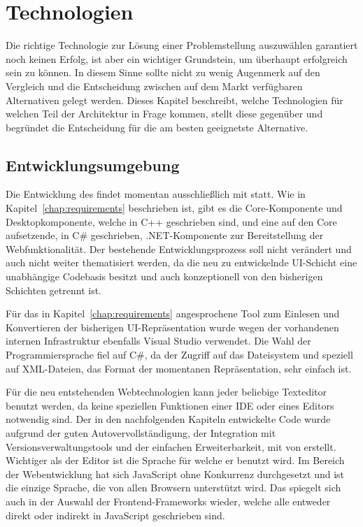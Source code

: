 \chapter{Technologien}\label{chap:technologies}
Die richtige Technologie zur Lösung einer Problemstellung auszuwählen garantiert noch keinen Erfolg, ist aber ein wichtiger Grundstein, um überhaupt erfolgreich sein zu können. In diesem Sinne sollte nicht zu wenig Augenmerk auf den Vergleich und die Entscheidung zwischen auf dem Markt verfügbaren Alternativen gelegt werden. Dieses Kapitel beschreibt, welche Technologien für welchen Teil der Architektur in Frage kommen, stellt diese gegenüber und begründet die Entscheidung für die am besten geeignetste Alternative.

\section{Entwicklungsumgebung}
Die Entwicklung des  findet momentan ausschließlich mit  statt. Wie in Kapitel~\ref{chap:requirements} beschrieben ist, gibt es die Core-Komponente und Desktopkomponente, welche in C++ geschrieben sind, und eine auf den Core aufsetzende, in C\# geschrieben, .NET-Komponente zur Bereitstellung der Webfunktionalität. Der bestehende Entwicklungsprozess soll nicht verändert und auch nicht weiter thematisiert werden, da die neu zu entwickelnde UI-Schicht eine unabhängige Codebasis besitzt und auch konzeptionell von den bisherigen Schichten getrennt ist. 

Für das in Kapitel~\ref{chap:requirements} angesprochene Tool zum Einlesen und Konvertieren der bisherigen UI-Repräsentation wurde wegen der vorhandenen internen Infrastruktur ebenfalls Visual Studio verwendet. Die Wahl der Programmiersprache fiel auf C\#, da der Zugriff auf das Dateisystem und speziell auf XML-Dateien, das Format der momentanen Repräsentation, sehr einfach ist. 

Für die neu entstehenden Webtechnologien kann jeder beliebige Texteditor benutzt werden, da keine speziellen Funktionen einer IDE oder eines Editors notwendig sind. Der in den nachfolgenden Kapiteln entwickelte Code wurde aufgrund der guten Autovervollständigung, der Integration mit Versionsverwaltungstools und der einfachen Erweiterbarkeit, mit  von  erstellt. Wichtiger als der Editor ist die Sprache für welche er benutzt wird. Im Bereich der Webentwicklung hat sich JavaScript ohne Konkurrenz durchgesetzt und ist die einzige Sprache, die von allen Browsern unterstützt wird. Das spiegelt sich auch in der Auswahl der Frontend-Frameworks wieder, welche alle entweder direkt oder indirekt in JavaScript geschrieben sind.   

